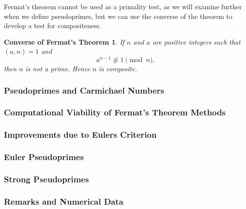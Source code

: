 \documentclass{article}
\begin{document}
\par Fermat's theorem cannot be used as a primality test, as we will examine further when we define pseudoprimes, but we can use the converse of the theorem to develop a test for compositeness.

\newtheorem*{fermatconverse}{Converse of Fermat's Theorem}
\begin{fermatconverse}
If $n$ and $a$ are positive integers such that $(a,n) = 1$ and
	$$a^{n-1} \not\equiv 1 \pmod n,$$
	then $n$ is not a prime. Hence $n$ is composite.
\end{fermatconverse}

\subsubsection{Pseudoprimes and Carmichael Numbers}


\subsubsection{Computational Viability of Fermat's Theorem Methods}

\subsubsection{Improvements due to Eulers Criterion}

\subsubsection{Euler Pseudoprimes}

\subsubsection{Strong Pseudoprimes}

\subsubsection{Remarks and Numerical Data}

\end{document}
